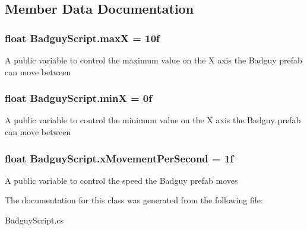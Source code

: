 \subsection{Member Data Documentation}
\hypertarget{class_badguy_script_a25c3c2d6c4f4458d7dceb9eb6e69d7c0}{
\subsubsection[{max\-X}]{\setlength{\rightskip}{0pt plus 5cm}float Badguy\-Script.\-max\-X = 10f}}\label{class_badguy_script_a25c3c2d6c4f4458d7dceb9eb6e69d7c0}
A public variable to control the maximum value on the X axis the Badguy prefab can move between \hypertarget{class_badguy_script_a4c4bd91ecd881d121488e41bafea8d14}{
\subsubsection[{min\-X}]{\setlength{\rightskip}{0pt plus 5cm}float Badguy\-Script.\-min\-X = 0f}}\label{class_badguy_script_a4c4bd91ecd881d121488e41bafea8d14}
A public variable to control the minimum value on the X axis the Badguy prefab can move between \hypertarget{class_badguy_script_a54a3b82f3f8a72ac65c2ef9de4d4bb67}{
\subsubsection[{x\-Movement\-Per\-Second}]{\setlength{\rightskip}{0pt plus 5cm}float Badguy\-Script.\-x\-Movement\-Per\-Second = 1f}}\label{class_badguy_script_a54a3b82f3f8a72ac65c2ef9de4d4bb67}
A public variable to control the speed the Badguy prefab moves 

The documentation for this class was generated from the following file\-:\begin{DoxyCompactItemize}
\item 
Badguy\-Script.\-cs\end{DoxyCompactItemize}
